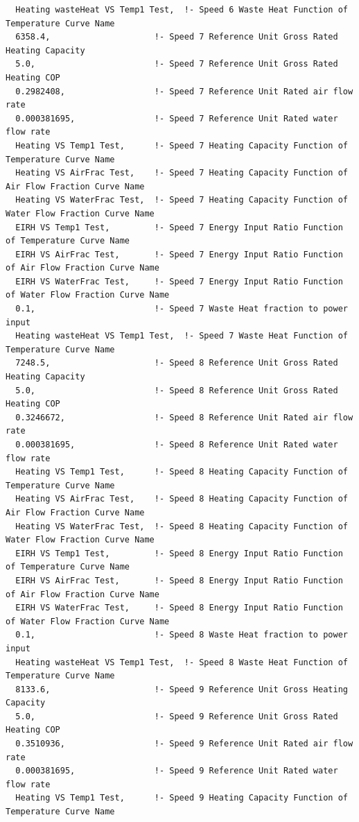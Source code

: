 \begin{lstlisting}
  Heating wasteHeat VS Temp1 Test,  !- Speed 6 Waste Heat Function of Temperature Curve Name
  6358.4,                     !- Speed 7 Reference Unit Gross Rated Heating Capacity
  5.0,                        !- Speed 7 Reference Unit Gross Rated Heating COP
  0.2982408,                  !- Speed 7 Reference Unit Rated air flow rate
  0.000381695,                !- Speed 7 Reference Unit Rated water flow rate
  Heating VS Temp1 Test,      !- Speed 7 Heating Capacity Function of Temperature Curve Name
  Heating VS AirFrac Test,    !- Speed 7 Heating Capacity Function of Air Flow Fraction Curve Name
  Heating VS WaterFrac Test,  !- Speed 7 Heating Capacity Function of Water Flow Fraction Curve Name
  EIRH VS Temp1 Test,         !- Speed 7 Energy Input Ratio Function of Temperature Curve Name
  EIRH VS AirFrac Test,       !- Speed 7 Energy Input Ratio Function of Air Flow Fraction Curve Name
  EIRH VS WaterFrac Test,     !- Speed 7 Energy Input Ratio Function of Water Flow Fraction Curve Name
  0.1,                        !- Speed 7 Waste Heat fraction to power input
  Heating wasteHeat VS Temp1 Test,  !- Speed 7 Waste Heat Function of Temperature Curve Name
  7248.5,                     !- Speed 8 Reference Unit Gross Rated Heating Capacity
  5.0,                        !- Speed 8 Reference Unit Gross Rated Heating COP
  0.3246672,                  !- Speed 8 Reference Unit Rated air flow rate
  0.000381695,                !- Speed 8 Reference Unit Rated water flow rate
  Heating VS Temp1 Test,      !- Speed 8 Heating Capacity Function of Temperature Curve Name
  Heating VS AirFrac Test,    !- Speed 8 Heating Capacity Function of Air Flow Fraction Curve Name
  Heating VS WaterFrac Test,  !- Speed 8 Heating Capacity Function of Water Flow Fraction Curve Name
  EIRH VS Temp1 Test,         !- Speed 8 Energy Input Ratio Function of Temperature Curve Name
  EIRH VS AirFrac Test,       !- Speed 8 Energy Input Ratio Function of Air Flow Fraction Curve Name
  EIRH VS WaterFrac Test,     !- Speed 8 Energy Input Ratio Function of Water Flow Fraction Curve Name
  0.1,                        !- Speed 8 Waste Heat fraction to power input
  Heating wasteHeat VS Temp1 Test,  !- Speed 8 Waste Heat Function of Temperature Curve Name
  8133.6,                     !- Speed 9 Reference Unit Gross Heating Capacity
  5.0,                        !- Speed 9 Reference Unit Gross Rated Heating COP
  0.3510936,                  !- Speed 9 Reference Unit Rated air flow rate
  0.000381695,                !- Speed 9 Reference Unit Rated water flow rate
  Heating VS Temp1 Test,      !- Speed 9 Heating Capacity Function of Temperature Curve Name

\end{lstlisting}
